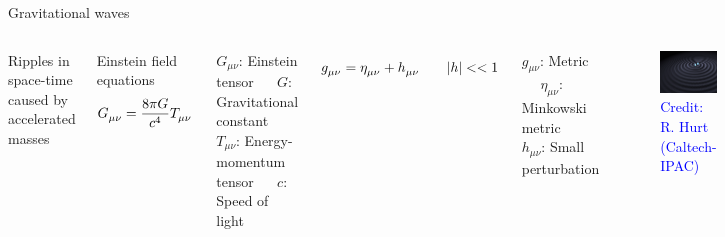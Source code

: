 \documentclass[pdf]{beamer}
\newcommand{\credit}[1]{\tiny{\textcolor{blue}{Credit: #1}}}
\begin{document}
\begin{frame}{Gravitational waves}
 \begin{columns}
 	\hspace{.5cm}
    Ripples in space-time caused by accelerated masses
        
	
	\begin{block}{Einstein field equations}
	\begin{equation*}
    \tensor{G}{_\mu_\nu} = \dfrac{8\pi G}{c^4} \tensor{T}{_\mu_\nu}  
    \end{equation*}
	\end{block}
	\begin{tiny}
	$G_{\mu\nu}$: Einstein tensor $\quad$ $G$: Gravitational constant \\
	$T_{\mu\nu}$: Energy-momentum tensor $\quad$ $c$: Speed of light
	\end{tiny}
	
	
    \begin{equation*}
    \tensor{g}{_\mu_\nu} = \tensor{\eta}{_\mu_\nu} + \tensor{h}{_\mu_\nu} \qquad |h|<<1 
    \end{equation*}
    \begin{tiny}
	$g_{\mu\nu}$: Metric $\quad$ $\eta_{\mu\nu}$: Minkowski metric \\
	$h_{\mu\nu}$: Small perturbation 
	\end{tiny}
    
    \begin{figure}
    \includegraphics[scale=.14]{fig/GravWave.jpg}
    \caption*{\credit{R. Hurt (Caltech-IPAC)}}
    \end{figure}
  \end{columns}

\end{frame}
\end{document}
